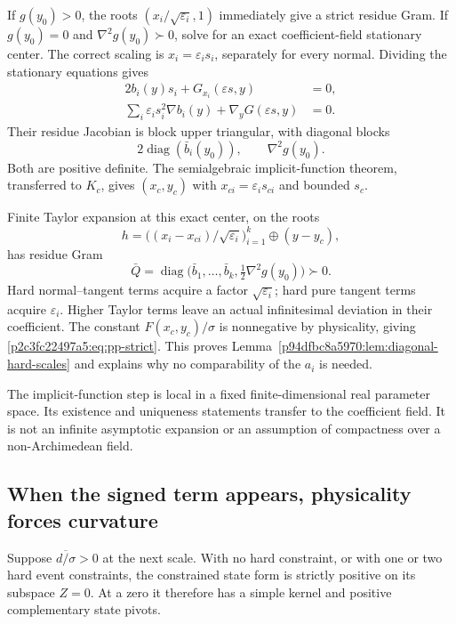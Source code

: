 If $g(y_0)>0$, the roots $(x_i/\sqrt{\varepsilon_i},1)$ immediately give a
strict residue Gram.  If $g(y_0)=0$ and $\nabla^2g(y_0)\succ0$, solve for an
exact coefficient-field stationary center.  The correct scaling is
$x_i=\varepsilon_i s_i$, separately for every normal.  Dividing the stationary
equations gives
\begin{align*}
 2b_i(y)s_i+G_{x_i}(\varepsilon s,y)&=0,\\
 \sum_i\varepsilon_i s_i^2\nabla b_i(y)
                 +\nabla_yG(\varepsilon s,y)&=0.
\end{align*}
Their residue Jacobian is block upper triangular, with diagonal blocks
\[
 2\operatorname{diag}(\bar b_i(y_0)),\qquad \nabla^2g(y_0).
\]
Both are positive definite.  The semialgebraic implicit-function theorem,
transferred to $K_c$, gives $(x_c,y_c)$ with
$x_{ci}=\varepsilon_i s_{ci}$ and bounded $s_c$.

Finite Taylor expansion at this exact center, on the roots
\[
 h=\big((x_i-x_{ci})/\sqrt{\varepsilon_i}\big)_{i=1}^k
                  \mathbin{\oplus}(y-y_c),
\]
has residue Gram
\[
 \bar Q=\operatorname{diag}
       \big(\bar b_1,\ldots,\bar b_k,\tfrac12\nabla^2g(y_0)\big)\succ0.
\]
Hard normal--tangent terms acquire a factor $\sqrt{\varepsilon_i}$;
hard pure tangent terms acquire $\varepsilon_i$.  Higher Taylor terms leave
an actual infinitesimal deviation in their coefficient.  The constant
$F(x_c,y_c)/\sigma$ is nonnegative by physicality, giving
\eqref{p2c3fc22497a5:eq:pp-strict}.  This proves Lemma~\ref{p94dfbc8a5970:lem:diagonal-hard-scales} and
explains why no comparability of the $a_i$ is needed.

The implicit-function step is local in a fixed finite-dimensional real
parameter space.  Its existence and uniqueness statements transfer to the
coefficient field.  It is not an infinite asymptotic expansion or an
assumption of compactness over a non-Archimedean field.

\subsection{When the signed term appears, physicality forces curvature}
Suppose $\overline{d/\sigma}>0$ at the next scale.  With no hard constraint,
or with one or two hard event constraints, the constrained state form is
strictly positive on its subspace $Z=0$.  At a zero it therefore has a simple
kernel and positive complementary state pivots.

